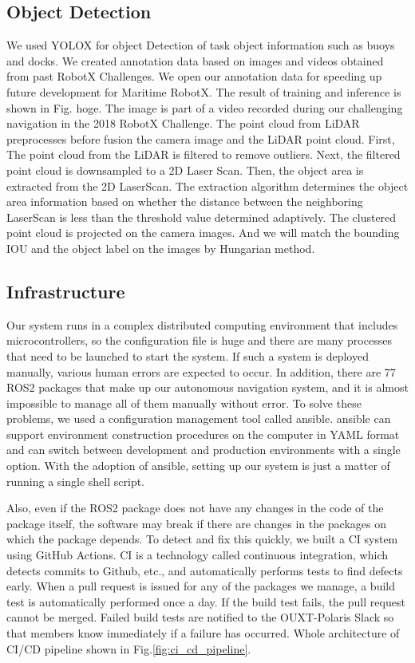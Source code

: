 \documentclass[lettersize,journal]{IEEEtran}
\begin{document}
\subsection{Object Detection}
We used  YOLOX\cite{YOLOX} for object Detection of task object information such as buoys and docks.
We created annotation data based on images and videos obtained from past RobotX Challenges.
We open our annotation data for speeding up future development for Maritime RobotX. \cite{dataset_annotations}
The result of training and inference is shown in Fig. hoge. 
The image is part of a video recorded during our challenging navigation in the 2018 RobotX Challenge.\cite{RobotX2018_video}
\indent The point cloud from LiDAR preprocesses before fusion the camera image and the LiDAR point cloud.
First, The point cloud from the LiDAR is filtered to remove outliers.
Next, the filtered point cloud is downsampled to a 2D Laser Scan.
Then, the object area is extracted from the 2D LaserScan. \cite{scan_segmentation}
The extraction algorithm determines the object area information based on whether the distance between 
the neighboring LaserScan is less than the threshold value determined adaptively.
The clustered point cloud is projected on the camera images.
And we will match the bounding IOU and the object label on the images by Hungarian method.

\subsection{Infrastructure}
Our system runs in a complex distributed computing environment that includes microcontrollers,
so the configuration file is huge and there are many processes that need to be launched to start the system.
If such a system is deployed manually, various human errors are expected to occur.
In addition, there are 77 ROS2 packages that make up our autonomous navigation system,
and it is almost impossible to manage all of them manually without error.
To solve these problems, we used a configuration management tool called ansible.
ansible can support environment construction procedures on the computer in YAML format and
can switch between development and production environments with a single option.
With the adoption of ansible, setting up our system is just a matter of running a single shell script.

Also, even if the ROS2 package does not have any changes in the code of the package itself,
the software may break if there are changes in the packages on which the package depends.
To detect and fix this quickly, we built a CI system using GitHub Actions.
CI is a technology called continuous integration, which detects commits to Github, etc.,
and automatically performs tests to find defects early.
When a pull request is issued for any of the packages we manage, a build test is automatically performed once a day.
If the build test fails, the pull request cannot be merged.
Failed build tests are notified to the OUXT-Polaris Slack so that members know immediately if a failure has occurred.
Whole architecture of CI/CD pipeline shown in Fig.\ref{fig:ci_cd_pipeline}.
\end{document}
